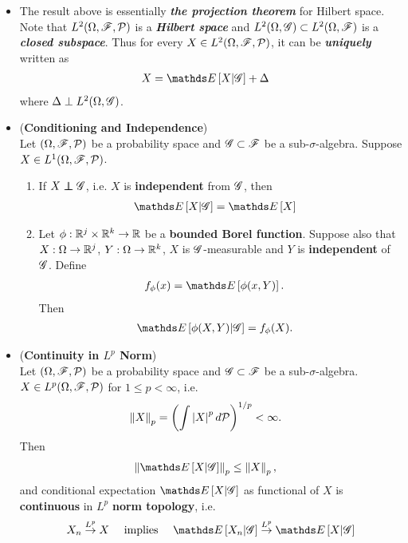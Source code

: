 \documentclass[11pt]{article}
\begin{document}
\begin{itemize}
\item \begin{remark}
The result above is essentially \emph{\textbf{the projection theorem}} for Hilbert space. Note that $L^{2}(\Omega, {\mathscr F}, {\mathcal P})$ is a \emph{\textbf{Hilbert space}} and $L^{2}(\Omega, {\mathscr G}) \subset  L^{2}(\Omega, {\mathscr F})$ is a \emph{\textbf{closed subspace}}. Thus for every $X \in L^{2}(\Omega, {\mathscr F}, {\mathcal P})$, it can be \emph{\textbf{uniquely}} written as
\begin{align*}
X &= \E{}{X| \srG} + \Delta
\end{align*} where $\Delta \perp L^{2}(\Omega, {\mathscr G})$.
\end{remark}

\item \begin{proposition} (\textbf{Conditioning and Independence})  \citep{resnick2013probability}\\
Let $(\Omega, {\mathscr F}, {\mathcal P})$ be a probability space and ${\mathscr G} \subset {\mathscr F}$ be a sub-$\sigma$-algebra. Suppose $X \in  L^{1}(\Omega, {\mathscr F}, {\mathcal P})$.  
\begin{enumerate}
\item If $X \indep \srG$, i.e. $X$ is \textbf{independent} from ${\mathscr G}$, then 
\begin{align*}
\E{}{X| \srG} &= \E{}{X}
\end{align*}
\item Let  $\phi: {\mathbb R}^j \times {\mathbb R}^k \rightarrow {\mathbb R}$ be a \textbf{bounded Borel function}. Suppose also that
$X: \Omega \rightarrow {\mathbb R}^j$, $Y: \Omega \rightarrow {\mathbb R}^k$, $X$ is ${\mathscr G}$-measurable and $Y$ is \textbf{independent} of ${\mathscr G}$. Define
\begin{align*}
f_{\phi}(x) &= \E{}{\phi(x, Y)}.
\end{align*}
Then
\begin{align*}
\E{}{\phi(X, Y) | \srG} &= f_{\phi}(X).
\end{align*}
\end{enumerate}
\end{proposition}

\item \begin{proposition} (\textbf{Continuity in $L^p$ Norm}) \citep{resnick2013probability}\\
Let $(\Omega, {\mathscr F}, {\mathcal P})$ be a probability space and ${\mathscr G} \subset {\mathscr F}$ be a sub-$\sigma$-algebra.  $X \in L^{p}(\Omega, {\mathscr F}, {\mathcal P})$ for $1 \le p < \infty$, i.e. 
\begin{align*}
\left\|X\right\|_{p} &= \left(\int \left\lvert X \right\rvert^p d{\mathcal P}\right)^{1/p} < \infty.
\end{align*} Then 
\begin{align*}
\norm{\E{}{X| \srG}}{p} &\le \norm{X}{p},
\end{align*} and conditional expectation $\E{}{X| \srG}$ as functional of $X$ is \textbf{continuous} in $L^p$ \textbf{norm topology}, i.e. 
\begin{align*}
X_n \stackrel{L^p}{\rightarrow} X \quad \text{ implies }\quad \E{}{X_n| \srG} \stackrel{L^p}{\rightarrow} \E{}{X| \srG}
\end{align*}
\end{proposition}


\end{itemize}
\end{document}
